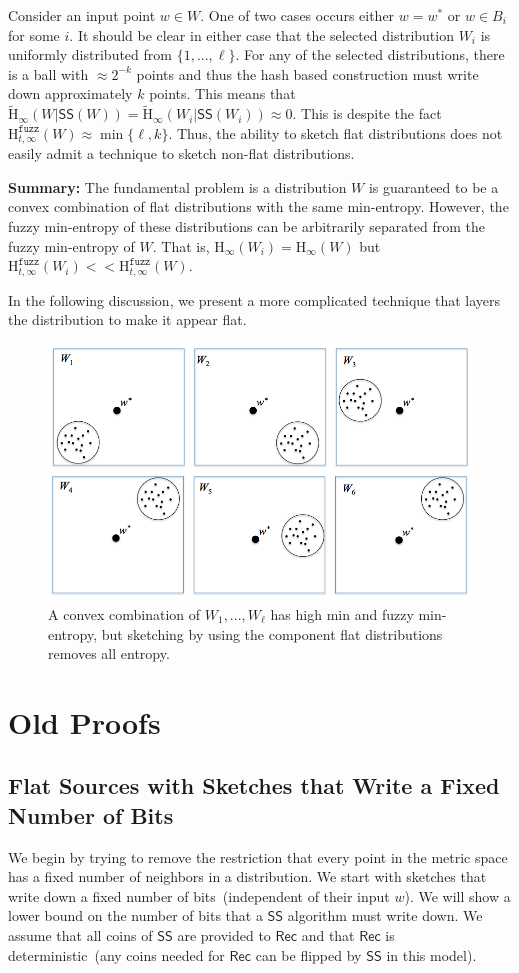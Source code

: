 \documentclass[11pt]{article}
\newcommand{\class}[1]{{\ensuremath{\mathsf{#1}}}}
\newcommand{\sketch}{\ensuremath{\class{SS}}\xspace}
\newcommand{\rec}{\ensuremath{\class{Rec}}\xspace}
\newcommand{\Hoo}{\mathrm{H}_\infty}
\newcommand{\Hav}{\tilde{\mathrm{H}}_\infty}
\newcommand{\Hfuzz}{\mathrm{H}^{\mathtt{fuzz}}_{t,\infty}}
\begin{document}
Consider an input point $w\in W$.  One of two cases occurs either $w=w^*$ or $w\in B_i$ for some $i$.  It should be clear in either case that the selected distribution $W_i$ is uniformly distributed from $\{1,..., \ell\}$.  For any of the selected distributions, there is a ball with $\approx 2^{-k}$ points and thus the hash based construction must write down approximately $k$ points.  This means that $\Hav(W | \sketch(W))  = \Hav(W_i | \sketch(W_i)) \approx 0$.  This is despite the fact $\Hfuzz(W) \approx \min\{\ell, k\}$.  Thus, the ability to sketch flat distributions does not easily admit a technique to sketch non-flat distributions.  

\textbf{Summary:} The fundamental problem is a distribution $W$ is guaranteed to be a convex combination of flat distributions with the same min-entropy.  However, the fuzzy min-entropy of these distributions can be arbitrarily separated from the fuzzy min-entropy of $W$.  That is, $\Hoo(W_i) = \Hoo(W)$ but $\Hfuzz(W_i) << \Hfuzz(W)$.

In the following discussion, we present a more complicated technique that layers the distribution to make it appear flat.

\begin{figure}[t]

\centering
    \includegraphics[width=.9\textwidth]{convexCombExample.png}
    \caption{A convex combination of $W_1,..., W_\ell$ has high min and fuzzy min-entropy, but sketching by using the component flat distributions removes all entropy.}
\label{fig:convex comb}    
\end{figure}


\section{Old Proofs}
\subsection{Flat Sources with Sketches that Write a Fixed Number of Bits}
We begin by trying to remove the restriction that every point in the metric space has a fixed number of neighbors in a distribution.  We start with sketches that write down a fixed number of bits~(independent of their input $w$).   We will show a lower bound on the number of bits that a $\sketch$ algorithm must write down.  We assume that all coins of $\sketch$ are provided to $\rec$ and that $\rec$ is deterministic~(any coins needed for $\rec$ can be flipped by $\sketch$ in this model).
\end{document}
